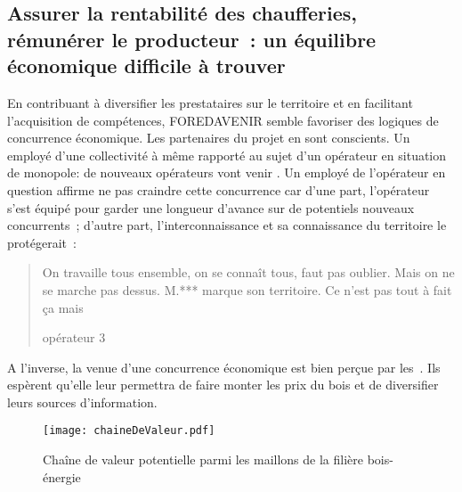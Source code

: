 \documentclass[12pt]{report}
\begin{document}
\subsection{Assurer la rentabilité des chaufferies, rémunérer le producteur~: un
équilibre économique difficile à trouver}

En contribuant à diversifier les prestataires sur le territoire et en facilitant
l'acquisition de compétences, FOREDAVENIR semble favoriser des logiques de
concurrence économique. Les partenaires du projet en sont
conscients. Un employé d'une collectivité à même rapporté au sujet d'un
opérateur en situation de monopole: de nouveaux opérateurs vont venir
. Un employé de l'opérateur en question affirme ne pas craindre cette
concurrence car d'une part, l'opérateur s'est équipé pour garder une longueur
d'avance sur de potentiels nouveaux concurrents~; d'autre part, l'interconnaissance
et sa connaissance du territoire le protégerait~: \blockquote[opérateur 3]{On
travaille tous ensemble, on se connaît tous, faut pas oublier.
Mais on ne se marche pas dessus. M.*** marque son territoire. Ce
n'est pas tout à fait ça mais}
A l'inverse, la venue d'une concurrence
économique est bien perçue par les~. Ils espèrent
qu'elle leur permettra de faire monter les prix du bois et de diversifier leurs
sources d'information.

\begin{figure}[h]
  \centering
  \texttt{[image: chaineDeValeur.pdf]}
  \caption{Chaîne de valeur potentielle parmi les maillons de la filière bois-énergie}\label{fig:CDV}
\end{figure}
\end{document}
